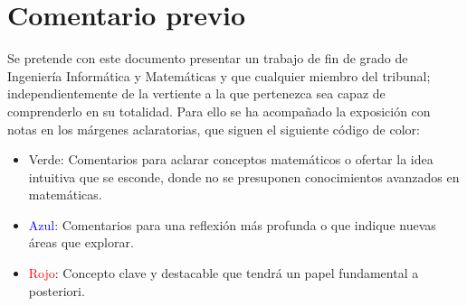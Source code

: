 
\section*{Comentario previo}

Se pretende con este documento presentar un  trabajo de fin de grado de Ingeniería Informática y Matemáticas y que cualquier miembro del tribunal; 
independientemente de la vertiente a la que pertenezca sea capaz de comprenderlo en su totalidad.  
Para ello se ha acompañado la exposición con notas en los márgenes aclaratorias, que siguen el siguiente código de color: 

\begin{itemize}
    \item \textcolor{dark_green}{Verde}: Comentarios para aclarar conceptos matemáticos o ofertar la idea intuitiva que se esconde, donde no se presuponen conocimientos avanzados en matemáticas. 
    \item \textcolor{blue}{Azul}: Comentarios para una reflexión más profunda o que indique nuevas áreas que explorar. 
    \item \textcolor{red}{Rojo}: Concepto clave y destacable que tendrá un papel fundamental a posteriori.  
\end{itemize}
